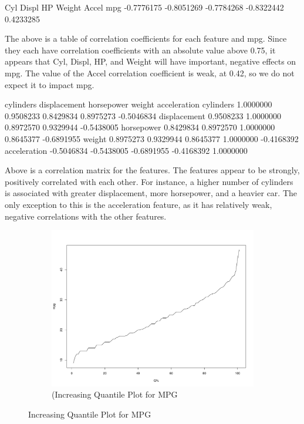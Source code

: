 \documentclass{homework}
\begin{document}
\question
\begin{rc}
           Cyl      Displ         HP     Weight     Accel
mpg -0.7776175 -0.8051269 -0.7784268 -0.8322442 0.4233285
\end{rc}
The above is a table of correlation coefficients for each feature and mpg. Since they each have correlation coefficients with an absolute value above 0.75, it appears that Cyl, Displ, HP, and Weight will have important, negative effects on mpg. The value of the Accel correlation coefficient is weak, at 0.42, so we do not expect it to impact mpg.

\question
\begin{rc}
              cylinders displacement horsepower     weight acceleration
cylinders     1.0000000    0.9508233  0.8429834  0.8975273   -0.5046834
displacement  0.9508233    1.0000000  0.8972570  0.9329944   -0.5438005
horsepower    0.8429834    0.8972570  1.0000000  0.8645377   -0.6891955
weight        0.8975273    0.9329944  0.8645377  1.0000000   -0.4168392
acceleration -0.5046834   -0.5438005 -0.6891955 -0.4168392    1.0000000
\end{rc}
Above is a correlation matrix for the features. The features appear to be strongly, positively correlated with each other. For instance, a higher number of cylinders is associated with greater displacement, more horsepower, and a heavier car. The only exception to this is the acceleration feature, as it has relatively weak, negative correlations with the other features.

\question
\begin{figure}
\centering
    \begin{subfigure}[b]{0.7\textwidth}
        \includegraphics[width=\textwidth]{graphs/qmpg.pdf}
        \caption{(Increasing Quantile Plot for MPG}
        \label{fig:quantile}
    \end{subfigure}
\caption{Increasing Quantile Plot for MPG}
\end{figure}
\end{document}
